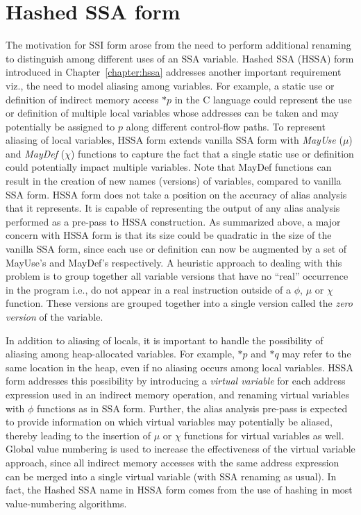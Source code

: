 \ifhssa
\section{Hashed SSA form}

The motivation for SSI form arose from the need to perform additional renaming to distinguish among different uses of an SSA variable. 
Hashed SSA (HSSA) form introduced in Chapter~\ref{chapter:hssa} addresses another important requirement viz., the need to model aliasing among variables. 
For example, a static use or definition of indirect memory access $*p$ in the C language could represent the use or definition of multiple local variables whose addresses can be taken and may potentially be assigned to $p$ along different control-flow paths. 
To represent aliasing of local variables, HSSA form extends vanilla SSA form with {\em MayUse} ($\mu$) and {\em MayDef} ($\chi$) functions to capture the fact that a single static use or definition could potentially impact multiple variables. 
Note that MayDef functions can result in the creation of new names (versions) of variables, compared to vanilla SSA form. 
HSSA form does not take a position on the accuracy of alias analysis that it represents. 
It is capable of representing the output of any alias analysis performed as a pre-pass to HSSA construction. 
As summarized above, a major concern with HSSA form is that its size could be quadratic in the size of the vanilla SSA form, since each use or definition can now be augmented by a set of MayUse's and MayDef's respectively. 
A heuristic approach to dealing with this problem is to group together all variable versions that have no ``real'' occurrence in the program i.e., do not appear in a real instruction outside of a $\phi$, $\mu$ or $\chi$ function. 
These versions are grouped together into a single version called the {\em zero version} of the variable.

In addition to aliasing of locals, it is important to handle the possibility of aliasing among heap-allocated variables. 
For example, $*p$ and $*q$ may refer to the same location in the heap, even if no aliasing occurs among local variables. 
HSSA form addresses this possibility by introducing a {\em virtual variable} for each address expression used in an indirect memory operation, and renaming virtual variables with $\phi$ functions as in SSA form. 
Further, the alias analysis pre-pass is expected to provide information on which virtual variables may potentially be aliased, thereby leading to the insertion of $\mu$ or $\chi$ functions for virtual variables as well. 
Global value numbering is used to increase the effectiveness of the virtual variable approach, since all indirect memory accesses with the same address expression can be merged into a single virtual variable (with SSA renaming as usual). 
In fact, the Hashed SSA name in HSSA form comes from the use of hashing in most value-numbering algorithms.
\fi

